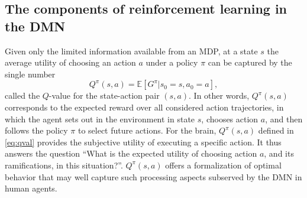 \documentclass[10pt,letterpaper]{article}
\def\V{\mathbf{V}}
\begin{document}
\subsection{The components of reinforcement learning in the DMN}
Given only the limited information available from an MDP, at a state $s$ the average
utility of choosing an action $a$ under a policy $\pi$ can be captured by the single number
\begin{equation}
  \label{eq:qval}
  Q^{\pi}(s,a) = \mathbb E [G^\pi|s_0=s,a_0=a],
\end{equation}
called the $Q$-value for the state-action pair $(s,a)$.
In other words, $Q^{\pi}(s,a)$ corresponds to the expected reward
over all considered action trajectories, in which
the agent sets out in the environment in state
$s$, chooses action $a$, and then follows the policy $\pi$ to select future actions.
For the brain,
$Q^{\pi}(s, a)$ defined in \eqref{eq:qval} provides the subjective
utility of executing a specific action.
It thus answers the question
``What is the expected utility of choosing action $a$, and its ramifications, in this situation?''.
$Q^{\pi}(s,a)$ offers a formalization of optimal behavior that
may well capture such processing aspects subserved by the DMN in human agents.



\end{document}
